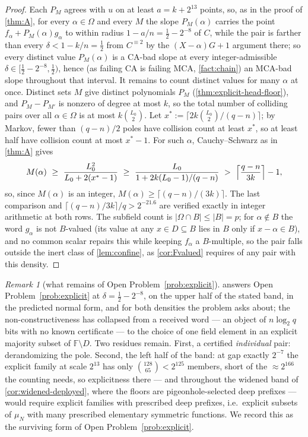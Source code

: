 \documentclass[11pt]{article}
\theoremstyle{definition}
\theoremstyle{remark}
\newtheorem{remark}[theorem]{Remark}
\newcommand{\F}{\mathbb{F}}
\newcommand{\B}{B}
\begin{document}
\begin{proof}
Each $P_M$ agrees with $u$ on at least $a=k+2^{13}$ points, so, as in the proof of \cref{thm:A}, for every $\alpha\in\Omega$ and every $M$ the slope $P_M(\alpha)$ carries the point $f_\alpha+P_M(\alpha)g_\alpha$ to within radius $1-a/n=\frac12-2^{-8}$ of $C$, while the pair is farther than every $\delta<1-k/n=\frac12$ from $C^{\equiv2}$ by the $(X-\alpha)G+1$ argument there; so every distinct value $P_M(\alpha)$ is a CA-bad slope at every integer-admissible $\delta\in[\frac12-2^{-8},\frac12)$, hence \textup(as failing CA is failing MCA, \cref{fact:chain}\textup) an MCA-bad slope throughout that interval. It remains to count distinct values for many $\alpha$ at once. Distinct sets $M$ give distinct polynomials $P_M$ \textup(\cref{thm:explicit-head-floor}\textup), and $P_M-P_{M'}$ is nonzero of degree at most $k$, so the total number of colliding pairs over all $\alpha\in\Omega$ is at most $k\binom{L_0}2$. Let $x^*:=\lceil2k\binom{L_0}2/(q-n)\rceil$; by Markov, fewer than $(q-n)/2$ poles have collision count at least $x^*$, so at least half have collision count at most $x^*-1$. For such $\alpha$, Cauchy--Schwarz as in \cref{thm:A} gives
\[
M(\alpha)\ \ge\ \frac{L_0^2}{L_0+2(x^*-1)}\ \ge\ \frac{L_0}{1+2k(L_0-1)/(q-n)}\ >\ \Bigl\lceil\frac{q-n}{3k}\Bigr\rceil-1,
\]
so, since $M(\alpha)$ is an integer,
$M(\alpha)\ge\lceil(q-n)/(3k)\rceil$. The last comparison and
$\lceil(q-n)/3k\rceil/q>2^{-21.6}$ are verified exactly in integer arithmetic
at both rows. The subfield count is $|\Omega\cap\B|\le|\B|=p$; for
$\alpha\notin\B$ the word $g_\alpha$ is not $\B$-valued \textup(its value at any
$x\in D\subseteq\B$ lies in $\B$ only if $x-\alpha\in\B$\textup), and no common
scalar repairs this while keeping $f_\alpha$ a $\B$-multiple, so the pair falls
outside the inert class of \cref{lem:confine}, as \cref{cor:Fvalued} requires
of any pair with this density.
\end{proof}

\begin{remark}[what remains of Open Problem~\ref{prob:explicit}]\label{rem:explicit-scope}
 answers Open Problem~\ref{prob:explicit} at $\delta=\frac12-2^{-8}$, on the upper half of the stated band, in the predicted normal form, and for both densities the problem asks about; the non-constructiveness has collapsed from a received word --- an object of $n\log_2q$ bits with no known certificate --- to the choice of one field element in an explicit majority subset of $\F\setminus D$. Two residues remain. First, a certified \emph{individual} pair: derandomizing the pole. Second, the left half of the band: at gap exactly $2^{-7}$ the explicit family at scale $2^{13}$ has only $\binom{128}{65}<2^{125}$ members, short of the $\approx2^{166}$ the counting needs, so explicitness there --- and throughout the widened band of \cref{cor:widened-deployed}, where the floors are pigeonhole-selected deep prefixes --- would require explicit families with prescribed deep prefixes, i.e.\ explicit subsets of $\mu_N$ with many prescribed elementary symmetric functions. We record this as the surviving form of Open Problem~\ref{prob:explicit}.
\end{remark}
\end{document}
